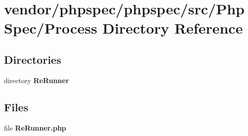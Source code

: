 \section{vendor/phpspec/phpspec/src/\+Php\+Spec/\+Process Directory Reference}
\label{dir_1c8bb10ad263e78ff7d9dc97a2d1a14e}
\subsection*{Directories}
\begin{DoxyCompactItemize}
\item 
directory {\bf Re\+Runner}
\end{DoxyCompactItemize}
\subsection*{Files}
\begin{DoxyCompactItemize}
\item 
file {\bf Re\+Runner.\+php}
\end{DoxyCompactItemize}
